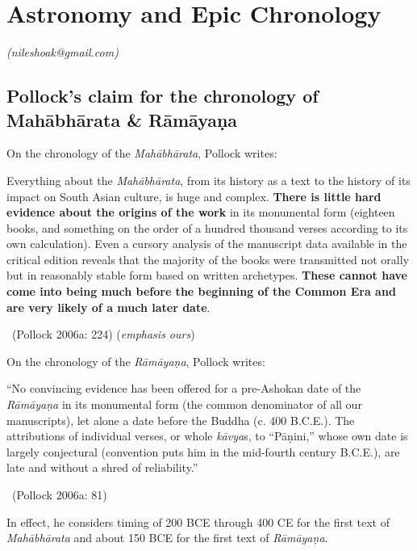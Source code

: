 
\chapter{Astronomy and Epic Chronology}\label{chapter2}


\begin{flushright}
\textit{(nileshoak@gmail.com)}
\end{flushright}


\section*{Pollock’s claim for the chronology of Mahābhārata \& Rāmāyaṇa}

On the chronology of the \textit{Mahābhārata}, Pollock writes:

\begin{myquote}
Everything about the \textit{Mahābhārata}, from its history as a text to the history of its impact on South Asian culture, is huge and complex. \textbf{There is little hard evidence about the origins of the work} in its monumental form (eighteen books, and something on the order of a hundred thousand verses according to its own calculation). Even a cursory analysis of the manuscript data available in the critical edition reveals that the majority of the books were transmitted not orally but in reasonably stable form based on written archetypes.\textbf{ These cannot have come into being much before the beginning of the Common Era and are very likely of a much later date}. 

~\hfill (Pollock 2006a: 224) (\textit{emphasis ours})
\end{myquote}

On the chronology of the \textit{Rāmāyaṇa}, Pollock writes:

\begin{myquote}
“No convincing evidence has been offered for a pre-Ashokan date of the \textit{Rāmāyaṇa} in its monumental form (the common denominator of all our manuscripts), let alone a date before the Buddha (c. 400 B.C.E.). The attributions of individual verses, or whole \textit{kāvya}s, to “Pāṇini,” whose own date is largely conjectural (convention puts him in the mid-fourth century B.C.E.), are late and without a shred of reliability.” 

~\hfill (Pollock 2006a: 81)
\end{myquote}

In effect, he considers timing of 200 BCE through 400 CE for the first text of \textit{Mahābhārata} and about 150 BCE for the first text of \textit{Rāmāyaṇa}.


